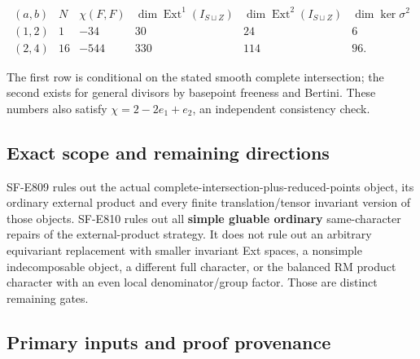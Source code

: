 \[
 \begin{array}{c|r|r|r|r|r}
 (a,b)&N&\chi(F,F)&\dim\operatorname{Ext}^1(I_{S\sqcup Z})&
 \dim\operatorname{Ext}^2(I_{S\sqcup Z})&\dim\ker\sigma^2\\ \hline
 (1,2)&1&-34&30&24&6\\
 (2,4)&16&-544&330&114&96.
 \end{array}
\]

The first row is conditional on the stated smooth complete intersection;
the second exists for general divisors by basepoint freeness and
Bertini. These numbers also satisfy \(\chi=2-2e_1+e_2\), an independent
consistency check.

\subsection{Exact scope and remaining
directions}\label{exact-scope-and-remaining-directions}

SF-E809 rules out the actual complete-intersection-plus-reduced-points
object, its ordinary external product and every finite
translation/tensor invariant version of those objects. SF-E810 rules out
all \textbf{simple gluable ordinary} same-character repairs of the
external-product strategy. It does not rule out an arbitrary equivariant
replacement with smaller invariant Ext spaces, a nonsimple
indecomposable object, a different full character, or the balanced RM
product character with an even local denominator/group factor. Those are
distinct remaining gates.

\subsection{Primary inputs and proof
provenance}\label{primary-inputs-and-proof-provenance}

